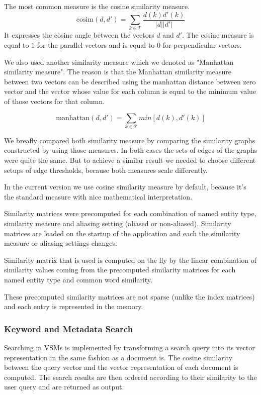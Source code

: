 The most common measure is the cosine similarity measure.
\[\text{cosim}(d,d') = \sum_{k \in \mathcal{T}}\frac{d(k)d'(k)}{|d||d'|}\]
It expresses the cosine angle between the vectors $d$ and $d'$. The cosine measure is equal to $1$ for the parallel vectors and is equal to $0$ for perpendicular vectors.

We also used another similarity measure which we denoted as "Manhattan similarity measure". The reason is that the Manhattan similarity measure between two vectors can be described using the manhattan distance between zero vector and the vector whose value for each column is equal to the minimum value of those vectors for that column.

\[\text{manhattan}(d,d') = \sum_{k \in \mathcal{T}}min[d(k), d'(k)]\]

We breafly compared both similarity measure by comparing the similarity graphs constructed by using those measures. In both cases the sets of edges of the graphs were quite the same. But to achieve a similar result we needed to choose different setups of edge thresholds, because both measures scale differently.

In the current version we use cosine similarity measure by default, because it's the standard measure with nice mathematical interpretation.

Similarity matrices were precomputed for each combination of named entity type, similarity measure and aliasing setting (aliased or non-aliased).
Similarity matrices are loaded on the startup of the application and each the similarity measure or aliasing settings changes.

Similarity matrix that is used is computed on the fly by the linear combination of similarity values coming from the precomputed similarity matrices for each named entity type and common word similarity.

These precomputed similarity matrices are not sparse (unlike the index matrices) and each entry is represented in the memory.   

\subsubsection{Keyword and Metadata Search}\label{sec:keyword_search}

Searching in VSMs is implemented by transforming a search query into its vector representation in the same fashion as a document is. The cosine similarity between the query vector and the vector representation of each document is computed. The search results are then ordered according to their similarity to the user query and are returned as output. 

